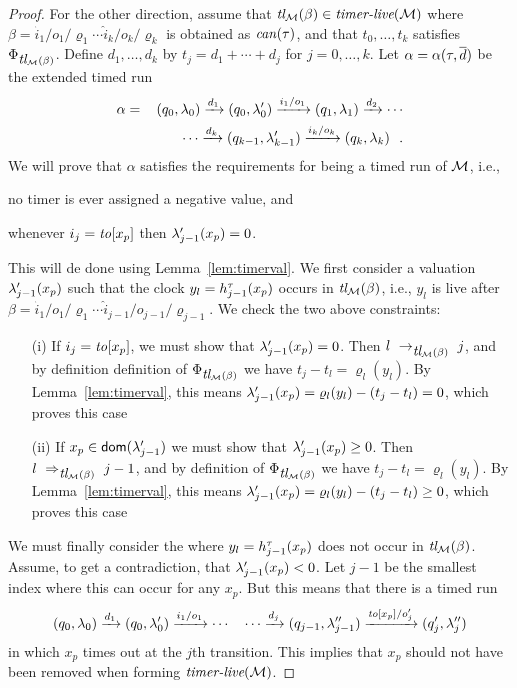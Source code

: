 \begin{proof}
For the other direction,
assume  that $\mbox{\it tl}_{{\mathcal M}}({\beta})\in\mbox{\it timer-live}({{\mathcal M}})$ where
$\beta = {\hat{i}_1/o_1/\varrho_1}  \cdots {\hat{i}_k/o_k/\varrho_k}$ is
obtained as $\mathit{can}({\tau})$,
and that $t_0, \ldots, t_k$ satisfies $\Phi_{\mbox{\it tl}_{{\mathcal M}}({\beta})}$. 
Define 
$d_1, \ldots , d_k$ by $t_j = d_1 + \cdots + d_j$ for $j = 0 , \ldots, k$.
Let $\alpha =\alpha(\tau,\overline{d})$ be the extended timed run
\begin{eqnarray*}
\alpha & = & (q_0,\lambda_0) \xrightarrow{d_1} (q_0,\lambda_0') \xrightarrow{i_1/o_1} (q_1,\lambda_1) \xrightarrow{d_2} 
\cdots
\\ && \qquad \cdots
\xrightarrow{d_k} (q_{k-1},\lambda_{k-1}') \xrightarrow{i_k/o_k} (q_k,\lambda_k)
\ \ .
\end{eqnarray*}
We will prove that $\alpha$
satisfies the requirements for being a timed run of ${\mathcal M}$, i.e.,
  \begin{inparaenum}[(i)]
  \item no timer is ever assigned a negative value, and
  \item whenever $i_j = \mathit{to}[x_p]$ then $\lambda_{j-1}'(x_p) = 0$.
  \end{inparaenum}
  This will de done using Lemma~\ref{lem:timerval}. We first consider a
  valuation $\lambda_{j-1}'(x_p)$ such that the clock
  $y_l = h_{j-1}^{\tau}(x_p)$ occurs in $\mbox{\it tl}_{{\mathcal M}}({\beta})$,
  i.e., $y_l$ is live after $\beta = {\hat{i}_1/o_1/\varrho_1}  \cdots {\hat{i}_{j-1}/o_{j-1}/\varrho_{j-1}}$. We check the two above constraints:
\begin{itemize}
  \item[(i)] If $i_j = \mathit{to}[x_p]$, we must show
    that $\lambda_{j-1}'(x_p) = 0$. Then $l \ \rightarrow_{\mbox{\it tl}_{{\mathcal M}}({\beta})} \  j$, and by definition
    definition of     $\Phi_{\mbox{\it tl}_{{\mathcal M}}({\beta})}$ we have
    $t_j - t_l = \varrho_l(y_l)$.
   By Lemma~\ref{lem:timerval}, this means
   $\lambda_{j-1}'(x_p) = \varrho_l(y_l) - (t_j - t_l) = 0$, which proves
   this case
\item[(ii)] If $x_p \in {\textsf{dom}}(\lambda_{j-1}')$ we must show
    that $\lambda_{j-1}'(x_p) \geq 0$. 
Then $l \ \Rightarrow_{\mbox{\it tl}_{{\mathcal M}}({\beta})}\  {j-1}$, and by
    definition of     $\Phi_{\mbox{\it tl}_{{\mathcal M}}({\beta})}$ we have
    $t_j - t_l = \varrho_l(y_l)$.
   By Lemma~\ref{lem:timerval}, this means
   $\lambda_{j-1}'(x_p) = \varrho_l(y_l) - (t_j - t_l) \geq 0$, which proves
   this case
\end{itemize}
   We must finally consider the where 
   $y_l = h_{j-1}^{\tau}(x_p)$ does not occur in $\mbox{\it tl}_{{\mathcal M}}({\beta})$.
   Assume, to get a contradiction, that $\lambda_{j-1}'(x_p) < 0$.
   Let $j-1$ be the smallest index where this can occur for any $x_p$. But
   this means that there is a timed run
\[
(q_0,\lambda_0) \xrightarrow{d_1} (q_0,\lambda_0') \xrightarrow{i_1/o_1}
\cdots \quad \cdots
\xrightarrow{d_j} (q_{j-1},\lambda_{j-1}'') \xrightarrow{\mathit{to}[x_p]/o_j'} (q_j',\lambda_j'')
\]
in which $x_p$ times out at the $j$th transition.
This implies that $x_p$ should not have been removed when forming
$\mbox{\it timer-live}({{\mathcal M}})$.
\end{proof}

